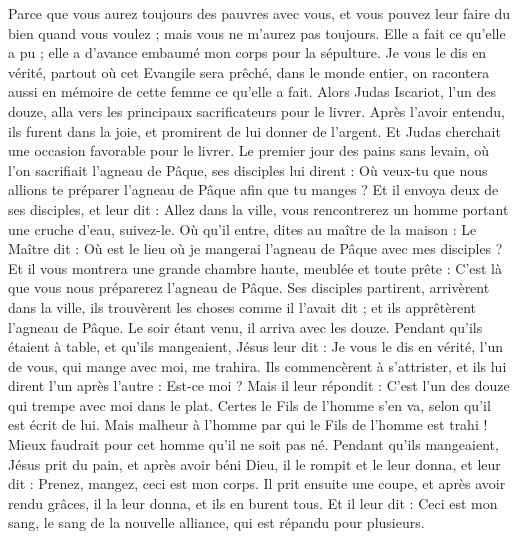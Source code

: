 \begin{multicols}{2}
Parce que vous aurez toujours des pauvres avec vous, et vous pouvez leur faire du bien quand vous voulez ; mais vous ne m'aurez pas toujours.
Elle a fait ce qu’elle a pu ; elle a d’avance embaumé mon corps pour la sépulture.
Je vous le dis en vérité, partout où cet Evangile sera prêché, dans le monde entier, on racontera aussi en mémoire de cette femme ce qu’elle a fait.
Alors Judas Iscariot, l'un des douze, alla vers les principaux sacrificateurs pour le livrer.
Après l’avoir entendu, ils furent dans la joie, et promirent de lui donner de l'argent. Et Judas cherchait une occasion favorable pour le livrer.
Le premier jour des pains sans levain, où l’on sacrifiait l'agneau de Pâque, ses disciples lui dirent : Où veux-tu que nous allions te préparer l'agneau de Pâque afin que tu manges ?
Et il envoya deux de ses disciples, et leur dit : Allez dans la ville, vous rencontrerez un homme portant une cruche d'eau, suivez-le.
Où qu’il entre, dites au maître de la maison : Le Maître dit : Où est le lieu où je mangerai l'agneau de Pâque avec mes disciples ?
Et il vous montrera une grande chambre haute, meublée et toute prête : C’est là que vous nous préparerez l'agneau de Pâque.
Ses disciples partirent, arrivèrent dans la ville, ils trouvèrent les choses comme il l’avait dit ; et ils apprêtèrent l'agneau de Pâque.
Le soir étant venu, il arriva avec les douze.
Pendant qu’ils étaient à table, et qu'ils mangeaient, Jésus leur dit : Je vous le dis en vérité, l'un de vous, qui mange avec moi, me trahira.
Ils commencèrent à s'attrister, et ils lui dirent l'un après l'autre : Est-ce moi ?
Mais il leur répondit : C'est l'un des douze qui trempe avec moi dans le plat.
Certes le Fils de l'homme s'en va, selon qu'il est écrit de lui. Mais malheur à l'homme par qui le Fils de l'homme est trahi ! Mieux faudrait pour cet homme qu’il ne soit pas né.
Pendant qu’ils mangeaient, Jésus prit du pain, et après avoir béni Dieu, il le rompit et le leur donna, et leur dit : Prenez, mangez, ceci est mon corps.
Il prit ensuite une coupe, et après avoir rendu grâces, il la leur donna, et ils en burent tous.
Et il leur dit : Ceci est mon sang{}, le sang de la nouvelle alliance, qui est répandu pour plusieurs.

\end{multicols}
